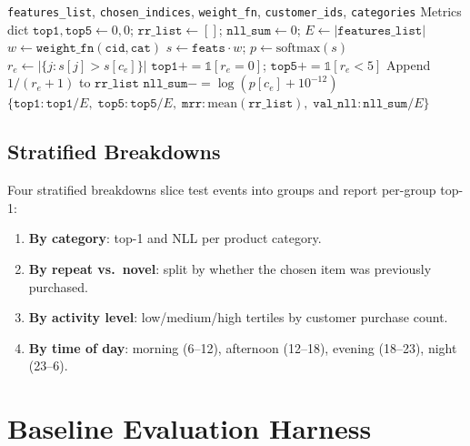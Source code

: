 \documentclass[11pt,a4paper]{article}
\begin{document}
\begin{algorithm}[H]
\caption{\textsc{ComputeMetrics}}\label{alg:compute-metrics}
\begin{algorithmic}[1]
\Require \texttt{features\_list}, \texttt{chosen\_indices}, \texttt{weight\_fn}, \texttt{customer\_ids}, \texttt{categories}
\Ensure Metrics dict
\State $\texttt{top1}, \texttt{top5} \gets 0, 0$; \; $\texttt{rr\_list} \gets []$; \; $\texttt{nll\_sum} \gets 0$; \; $E \gets |\texttt{features\_list}|$
    \State $w \gets \texttt{weight\_fn}(\texttt{cid}, \texttt{cat})$
    \State $s \gets \texttt{feats} \cdot w$; \; $p \gets \text{softmax}(s)$
    \State $r_e \gets |\{j : s[j] > s[c_e]\}|$
    \State $\texttt{top1} \mathrel{{+}{=}} \mathbb{1}[r_e = 0]$; \; $\texttt{top5} \mathrel{{+}{=}} \mathbb{1}[r_e < 5]$
    \State Append $1/(r_e + 1)$ to $\texttt{rr\_list}$
    \State $\texttt{nll\_sum} \mathrel{{-}{=}} \log(p[c_e] + 10^{-12})$
\EndFor
\State \Return $\{\texttt{top1}: \texttt{top1}/E,\; \texttt{top5}: \texttt{top5}/E,\; \texttt{mrr}: \text{mean}(\texttt{rr\_list}),\; \texttt{val\_nll}: \texttt{nll\_sum}/E\}$
\end{algorithmic}
\end{algorithm}

\subsection{Stratified Breakdowns}

Four stratified breakdowns slice test events into groups and report per-group top-1:
\begin{enumerate}
\item \textbf{By category}: top-1 and NLL per product category.
\item \textbf{By repeat vs.\ novel}: split by whether the chosen item was previously purchased.
\item \textbf{By activity level}: low/medium/high tertiles by customer purchase count.
\item \textbf{By time of day}: morning (6--12), afternoon (12--18), evening (18--23), night (23--6).
\end{enumerate}


\section{Baseline Evaluation Harness}
\label{sec:baselines-harness}
\end{document}
